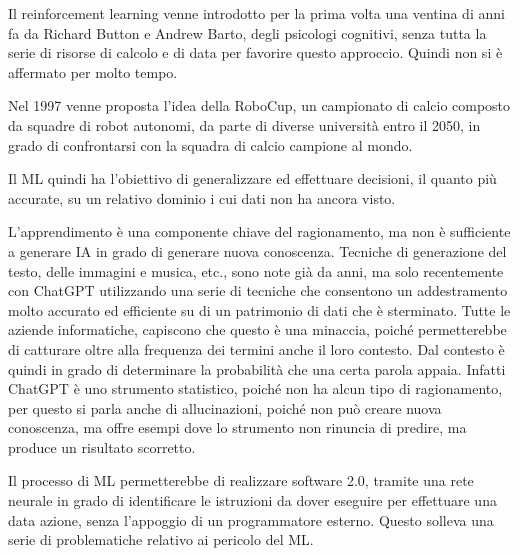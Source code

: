 \documentclass{article}
\numberwithin{equation}{subsection}
\begin{document}
Il reinforcement learning venne introdotto per la prima volta una ventina di anni fa da Richard Button e Andrew Barto, 
degli psicologi cognitivi, senza tutta la serie di risorse di calcolo e di data per favorire questo approccio. 
Quindi non si è affermato per molto tempo. 

Nel 1997 venne proposta l'idea della RoboCup, un campionato di calcio composto da squadre di robot autonomi, 
da parte di diverse università entro il 2050, in grado di confrontarsi con la squadra di calcio campione 
al mondo. 

Il ML quindi ha l'obiettivo di generalizzare ed effettuare decisioni, il quanto più accurate, su un relativo dominio 
i cui dati non ha ancora visto. 


L'apprendimento è una componente chiave del ragionamento, ma non è sufficiente a generare IA in grado di 
generare nuova conoscenza. Tecniche di generazione del testo, delle immagini e musica, etc., sono note 
già da anni, ma solo recentemente con ChatGPT utilizzando una serie di tecniche che consentono un 
addestramento molto accurato ed efficiente su di un patrimonio di dati che è sterminato. 
Tutte le aziende informatiche, capiscono che questo è una minaccia, poiché permetterebbe di catturare 
oltre alla frequenza dei termini anche il loro contesto. Dal contesto è quindi in grado di determinare 
la probabilità che una certa parola appaia. 
Infatti ChatGPT è uno strumento statistico, poiché non ha alcun tipo di ragionamento, per questo si 
parla anche di allucinazioni, poiché non può creare nuova conoscenza, ma offre esempi dove lo strumento 
non rinuncia di predire, ma produce un risultato scorretto. 


Il processo di ML permetterebbe di realizzare software 2.0, tramite una rete neurale in grado di identificare 
le istruzioni da dover eseguire per effettuare una data azione, senza l'appoggio di un programmatore esterno. 
Questo solleva una serie di problematiche relativo ai pericolo del ML. 
\end{document}
